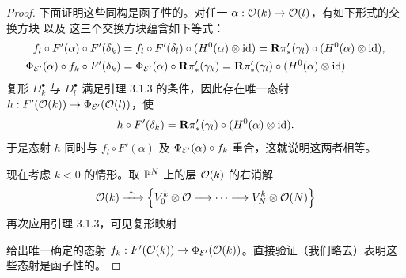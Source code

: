 \begin{proof}
下面证明这些同构是函子性的。对任一 $\alpha:\mathcal{O}(k)\to\mathcal{O}(l)$，有如下形式的交换方块
以及
这三个交换方块蕴含如下等式：
\begin{align*}
f_{l}\circ F'(\alpha)\circ F'(\delta_{k})&=f_{l}\circ F'(\delta_{l})\circ(H^{0}(\alpha)\otimes\mathrm{id})=\mathbf{R}\pi'_{*}(\gamma_{l})\circ(H^{0}(\alpha)\otimes\mathrm{id}),\\
\Phi_{\mathcal{E}'}(\alpha)\circ f_{k}\circ F'(\delta_{k})&=\Phi_{\mathcal{E}'}(\alpha)\circ\mathbf{R}\pi'_{*}(\gamma_{k})=\mathbf{R}\pi'_{*}(\gamma_{l})\circ(H^{0}(\alpha)\otimes\mathrm{id}).
\end{align*}
复形 $D^{\bullet}_{k}$ 与 $D^{\bullet}_{l}$ 满足引理 3.1.3 的条件，因此存在唯一态射 $h:F'(\mathcal{O}(k))\to\Phi_{\mathcal{E}'}(\mathcal{O}(l))$，使
\begin{equation*}
h\circ F'(\delta_{k})=\mathbf{R}\pi'_{*}(\gamma_{l})\circ(H^{0}(\alpha)\otimes\mathrm{id}).
\end{equation*}
于是态射 $h$ 同时与 $f_{l}\circ F'(\alpha)$ 及 $\Phi_{\mathcal{E}'}(\alpha)\circ f_{k}$ 重合，这就说明这两者相等。

现在考虑 $k<0$ 的情形。取 $\mathbb{P}^{N}$ 上的层 $\mathcal{O}(k)$ 的右消解
\begin{equation*}
\mathcal{O}(k)\xrightarrow{\ \sim\ }\Bigl\{V^{k}_{0}\otimes\mathcal{O}\longrightarrow\cdots\longrightarrow V^{k}_{N}\otimes\mathcal{O}(N)\Bigr\}
\end{equation*}
再次应用引理 3.1.3，可见复形映射
\begin{center}\end{center}
给出唯一确定的态射 $f_{k}:F'(\mathcal{O}(k))\to\Phi_{\mathcal{E}'}(\mathcal{O}(k))$。直接验证（我们略去）表明这些态射是函子性的。
\end{proof}

